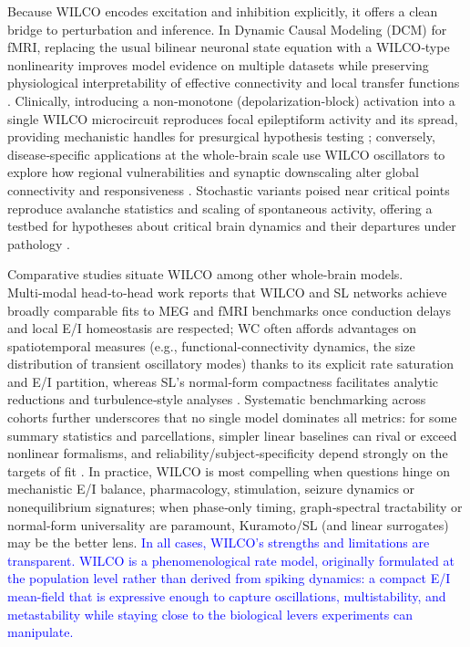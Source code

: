 \documentclass[12pt]{article}
\numberwithin{equation}{section}
\newcommand{\rev}[1]{\textcolor{blue}{#1}}
\begin{document}
Because WILCO encodes excitation and inhibition explicitly, it offers a clean bridge to perturbation and inference. In Dynamic Causal Modeling (DCM) for fMRI, replacing the usual bilinear neuronal state equation with a WILCO‑type nonlinearity improves model evidence on multiple datasets while preserving physiological interpretability of effective connectivity and local transfer functions \cite{Sadeghi2020}. Clinically, introducing a non‑monotone (depolarization‑block) activation into a single WILCO microcircuit reproduces focal epileptiform activity and its spread, providing mechanistic handles for presurgical hypothesis testing \cite{Meijer2015}; conversely, disease‑specific applications at the whole‑brain scale use WILCO oscillators to explore how regional vulnerabilities and synaptic downscaling alter global connectivity and responsiveness \cite{SanchezRodriguez2024}. Stochastic variants poised near critical points reproduce avalanche statistics and scaling of spontaneous activity, offering a testbed for hypotheses about critical brain dynamics and their departures under pathology \cite{deCandia2021,Apicella2022,Alvankar2023}.

Comparative studies situate WILCO among other whole‑brain models. Multi‑modal head‑to‑head work reports that WILCO and SL networks achieve broadly comparable fits to MEG and fMRI benchmarks once conduction delays and local E/I homeostasis are respected; WC often affords advantages on spatiotemporal measures (e.g., functional‑connectivity dynamics, the size distribution of transient oscillatory modes) thanks to its explicit rate saturation and E/I partition, whereas SL’s normal‑form compactness facilitates analytic reductions and turbulence‑style analyses \cite{Castaldo2023}. Systematic benchmarking across cohorts further underscores that no single model dominates all metrics: for some summary statistics and parcellations, simpler linear baselines can rival or exceed nonlinear formalisms, and reliability/subject‑specificity depend strongly on the targets of fit \cite{Domhof2022}. In practice, WILCO is most compelling when questions hinge on mechanistic E/I balance, pharmacology, stimulation, seizure dynamics or nonequilibrium signatures; when phase‑only timing, graph‑spectral tractability or normal‑form universality are paramount, Kuramoto/SL (and linear surrogates) may be the better lens. 
\rev{In all cases, WILCO's strengths and limitations are transparent. WILCO is a phenomenological rate model, originally formulated at the population level rather than derived from spiking dynamics: a compact E/I mean-field that is expressive enough to capture oscillations, multistability, and metastability while staying close to the biological levers experiments can manipulate.}
\end{document}

